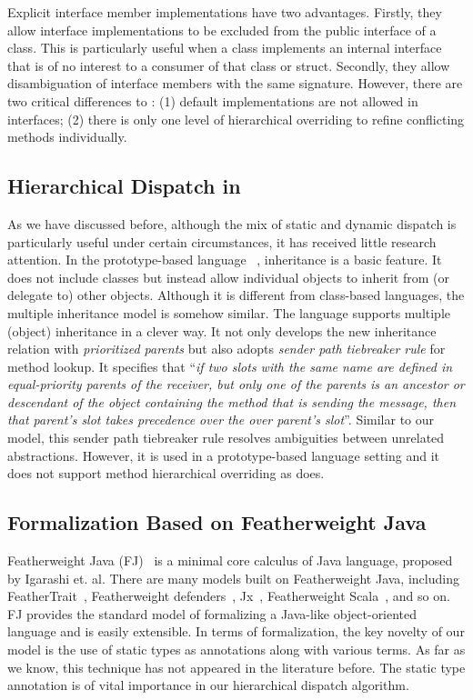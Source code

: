 Explicit interface member implementations have two advantages.
Firstly, they allow interface implementations to be excluded 
from the public interface of a class. This is particularly useful when a class implements an internal 
interface that is of no interest to a consumer of that class or struct.
Secondly, they allow disambiguation of interface members with the 
same signature. However, there are two critical differences to \MIM{}:
(1) default implementations are not allowed in \csharp{} interfaces; 
(2) there is only one level of hierarchical overriding to refine conflicting methods individually.

\subsection{Hierarchical Dispatch in \self{}}
As we have discussed before, although the mix of static and dynamic dispatch is 
particularly useful under certain circumstances, it has received little research attention. 
In the prototype-based language \self{}~\cite{Chambers1991}, inheritance is a basic feature.
It does not include classes but instead allow individual objects to inherit from (or delegate to) other objects. 
Although it is different from class-based languages, the multiple inheritance model is somehow similar. The \self{}
language supports multiple (object) inheritance in a clever way. It not only develops the new inheritance
relation with \emph{prioritized parents} but also adopts \emph{sender path tiebreaker rule} for method lookup.
It specifies that ``\emph{if two slots with the same name are defined in equal-priority parents of the receiver, but only 
one of the parents is an ancestor or descendant of the object containing the method that is sending the message,
then that parent's slot takes precedence over the over parent's slot}''. 
Similar to our model, this sender path tiebreaker rule resolves ambiguities between unrelated abstractions. However,
it is used in a prototype-based language setting and it does not support method hierarchical overriding as \MIM{} does.

\subsection{Formalization Based on Featherweight Java}
Featherweight Java (FJ)~\cite{Igarashi01FJ} is a minimal core calculus of Java language, 
proposed by Igarashi et. al. There are many models built on Featherweight Java, 
including FeatherTrait~\cite{Liquori08ftj}, Featherweight defenders~\cite{goetz12fdefenders}, Jx~\cite{Nystrom2004}, 
Featherweight Scala~\cite{Cremet2006}, and so on.
FJ provides the standard model of formalizing a Java-like object-oriented language and 
is easily extensible. In terms of formalization, the key novelty of our model is the use of 
static types as annotations along with various terms. As far as we
know, this technique has not appeared in the literature before. The static type annotation is of vital 
importance in our hierarchical dispatch algorithm.








